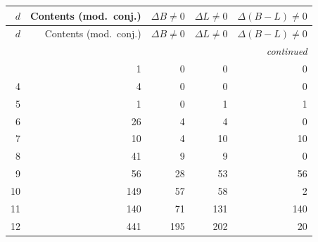 {\small\setlength{\tabcolsep}{6pt}
\begin{longtable}{@{}rrrrr@{}}
\toprule
$d$ & Contents (mod.\ conj.) & $\Delta B\neq 0$ & $\Delta L \neq 0$ & $\Delta(B{-}L)\neq 0$ \\
\midrule\endfirsthead
\toprule
$d$ & Contents (mod.\ conj.) & $\Delta B\neq 0$ & $\Delta L \neq 0$ & $\Delta(B{-}L)\neq 0$ \\
\midrule\endhead
\midrule\multicolumn{5}{r}{\emph{continued}}\\\endfoot
\bottomrule\endlastfoot
2 & 1 & 0 & 0 & 0 \\
4 & 4 & 0 & 0 & 0 \\
5 & 1 & 0 & 1 & 1 \\
6 & 26 & 4 & 4 & 0 \\
7 & 10 & 4 & 10 & 10 \\
8 & 41 & 9 & 9 & 0 \\
9 & 56 & 28 & 53 & 56 \\
10 & 149 & 57 & 58 & 2 \\
11 & 140 & 71 & 131 & 140 \\
12 & 441 & 195 & 202 & 20 \\
\end{longtable}}
